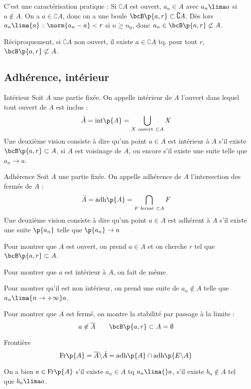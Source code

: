 \documentclass[a4paper,french,bookmarks]{book}
\begin{document}
    C'est une caractérisation pratique :
    Si $\complement A$ est ouvert, $a_n \in A$ avec $a_n \lima a$ si $a \not\in A$. On a $a \in \complement A$, donc on a une boule $\bcB\p{a, r} \subset \complement A$. Dès lors $a_n \lima{a}$ : $\norm{a_n - a} < r$ si $n \geq n_0$, donc $a_n \in \bcB\p{a, r} \not\subset A$.
    
    Réciproquement, si $\complement A$ non ouvert, il existe $a \in \complement A$ tq. pour tout $r$, $\bcB\p{a, r} \not\subset A$.
    
    \subsection{Adhérence, intérieur}

    \begin{definition}{Intérieur}{}
        Soit $A$ une partie fixée. On appelle intérieur de $A$ l'ouvert dans lequel tout ouvert de $A$ est inclus :
        \[ \mathring{A} = \mathrm{int}\p{A} = \bigcup_{X \ \text{ouvert} \ \subset A} X\]
        Une deuxième vision consiste à dire qu'un point $a \in A$ est intérieur à $A$ s'il existe $\bcB\p{a, r} \subset A$, \ie si $A$ est voisinage de $A$, ou encore s'il existe une suite telle que $a_n \to a$.
    \end{definition}

    \begin{definition}{Adhérence}{}
        Soit $A$ une partie fixée. On appelle adhérence de $A$ l'intersection des fermés de $A$ : 
        \[ \bar{A} = \mathrm{adh}\p{A} = \bigcap_{F\ \text{fermé}\ \subset A} F \]
        Une deuxième vision consiste à dire qu'un point $a \in A$ est adhérent à $A$ s'il existe une suite $\p{a_n}$ telle que $\p{a_n} \to a$
    \end{definition}
    Pour montrer que $A$ est ouvert, on prend $a \in A$ et on cherche $r$ tel que $\bcB\p{a, r} \subset A$.
    
    Pour montrer que $a$ est intérieur à $A$, on fait de même.
    
    Pour montrer qu'il est non intérieur, on prend une suite de $a_n \not \in A$ telle que $a_n \lima{n \to +\infty} a$.
    
    Pour montrer que $A$ est fermé, on montre la stabilité par passage à la limite :
    \[ a \not\in \overline{A} \qquad \bcB\p{a, r} \subset A = \emptyset\]
    \begin{definition}{Frontière}{}
        \[ \mathrm{Fr}\p{A} = \overline{A} \backslash \mathring{A} = \mathrm{adh}\p{A} \cap \mathrm{adh}\p{E \backslash A}\]
    \end{definition}
    On a bien $a \in \mathrm{Fr}\p{A}$ s'il existe $a_n \in A$ tq $a_n \lima{} a$, s'il existe $b_n \not\in A$ tel que $b_n \lima a$. 
    
\end{document}
